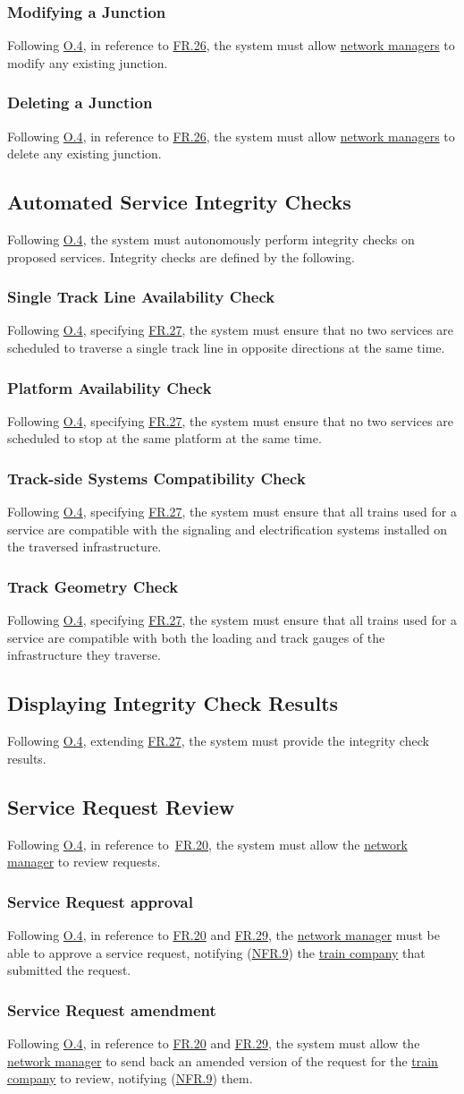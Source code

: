 \documentclass[12pt]{article}
\newcommand\un[1]{\underline{#1}}
\newcommand\hyl[1]{\hyperref[#1]{#1}}
\newcommand\subs[2]{\subsection{#1}\label{#2}}
\newcommand\ssubs[2]{\subsubsection{#1}\label{#2}}
\begin{document}
\ssubs{Modifying a Junction}{FR.26.2}
Following \hyl{O.4}, in reference to \hyl{FR.26}, the system must allow \un{network managers} to modify any existing junction.  

\ssubs{Deleting a Junction}{FR.26.3}
Following \hyl{O.4}, in reference to \hyl{FR.26}, the system must allow \un{network managers} to delete any existing junction.  

\subs{Automated Service Integrity Checks}{FR.27}
Following \hyl{O.4}, the system must autonomously perform integrity checks on proposed services.
Integrity checks are defined by the following.

\ssubs{Single Track Line Availability Check}{FR.27.1}
Following \hyl{O.4}, specifying \hyl{FR.27}, the system must ensure that no two services are scheduled to traverse a single track line in opposite directions at the same time.

\ssubs{Platform Availability Check}{FR.27.2}
Following \hyl{O.4}, specifying \hyl{FR.27}, the system must ensure that no two services are scheduled to stop at the same platform at the same time.

\ssubs{Track-side Systems Compatibility Check}{FR.27.3}
Following \hyl{O.4}, specifying \hyl{FR.27}, the system must ensure that all trains used for a service are compatible with the signaling and electrification systems installed on the traversed infrastructure.

\ssubs{Track Geometry Check}{FR.27.4}
Following \hyl{O.4}, specifying \hyl{FR.27}, the system must ensure that all trains used for a service are compatible with both the loading and track gauges of the infrastructure they traverse.

\subs{Displaying Integrity Check Results}{FR.28}
Following \hyl{O.4}, extending \hyl{FR.27}, the system must provide the integrity check results.

\subs{Service Request Review}{FR.29}
Following \hyl{O.4}, in reference to \hyl{FR.20}, the system must allow the \un{network manager} to review requests.

\ssubs{Service Request approval}{FR.29.1}
Following \hyl{O.4}, in reference to \hyl{FR.20} and \hyl{FR.29}, the \un{network manager} must be able to approve a service request, notifying (\hyl{NFR.9}) the \un{train company} that submitted the request.

\ssubs{Service Request amendment}{FR.29.2}
Following \hyl{O.4}, in reference to \hyl{FR.20} and \hyl{FR.29}, the system must allow the \un{network manager} to send back an amended version of the request for 
the \un{train company} to review, notifying (\hyl{NFR.9}) them.
\end{document}
